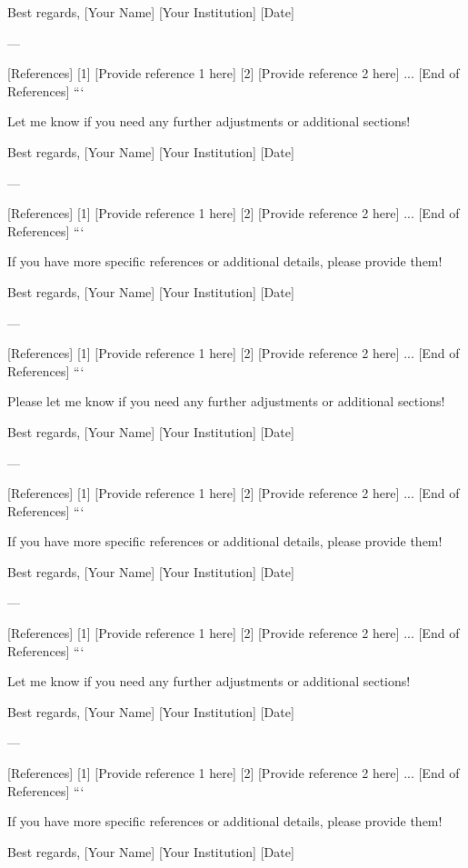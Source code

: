 Best regards,  
[Your Name]  
[Your Institution]  
[Date]  

--- 

[References]  
[1] [Provide reference 1 here]  
[2] [Provide reference 2 here]  
...  
[End of References]  
``` 

Let me know if you need any further adjustments or additional sections! 

Best regards,  
[Your Name]  
[Your Institution]  
[Date]  

--- 

[References]  
[1] [Provide reference 1 here]  
[2] [Provide reference 2 here]  
...  
[End of References]  
``` 

If you have more specific references or additional details, please provide them! 

Best regards,  
[Your Name]  
[Your Institution]  
[Date]  

--- 

[References]  
[1] [Provide reference 1 here]  
[2] [Provide reference 2 here]  
...  
[End of References]  
``` 

Please let me know if you need any further adjustments or additional sections! 

Best regards,  
[Your Name]  
[Your Institution]  
[Date]  

--- 

[References]  
[1] [Provide reference 1 here]  
[2] [Provide reference 2 here]  
...  
[End of References]  
``` 

If you have more specific references or additional details, please provide them! 

Best regards,  
[Your Name]  
[Your Institution]  
[Date]  

--- 

[References]  
[1] [Provide reference 1 here]  
[2] [Provide reference 2 here]  
...  
[End of References]  
``` 

Let me know if you need any further adjustments or additional sections! 

Best regards,  
[Your Name]  
[Your Institution]  
[Date]  

--- 

[References]  
[1] [Provide reference 1 here]  
[2] [Provide reference 2 here]  
...  
[End of References]  
``` 

If you have more specific references or additional details, please provide them! 

Best regards,  
[Your Name]  
[Your Institution]  
[Date]  

